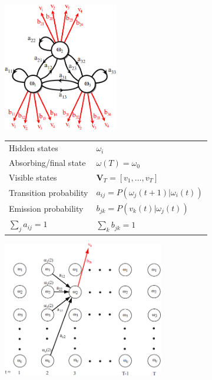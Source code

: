   \begin{minipage}{8cm}
	\hspace{1cm}
    \includegraphics[width=5cm]{./images/hiddenMarkovModel.png}
    
    \begin{tabular}{ll}
      Hidden states              &$\omega_i$\\
      Absorbing/final state      &$\omega(T) = \omega_0$\\
      Visible states             &$\bm V_T = [v_1, \ldots, v_T]$\\
      Transition probability     &$a_{ij} = P(\omega_j(t+1) | \omega_i(t))$\\
      Emission probability       &$b_{jk} = P(v_k(t) | \omega_j(t))$\\
      $\sum\limits_j a_{ij} = 1$ &$\sum\limits_k b_{jk} = 1$\\
    \end{tabular}
    
    \includegraphics[width=7cm]{./images/hiddenMarkovModel2.png}
  \end{minipage}
  